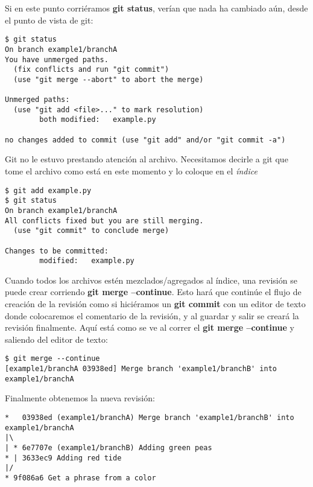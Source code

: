Si en este punto corriéramos {\bf git status}, verían que nada ha cambiado aún, desde el punto de vista de git:

\begin{lstlisting}[style=console_style, caption={\bf git status} luego de editar el archivo]
$ git status
On branch example1/branchA
You have unmerged paths.
  (fix conflicts and run "git commit")
  (use "git merge --abort" to abort the merge)

Unmerged paths:
  (use "git add <file>..." to mark resolution)
        both modified:   example.py

no changes added to commit (use "git add" and/or "git commit -a")
\end{lstlisting}

Git no le estuvo prestando atención al archivo. Necesitamos decirle a git que tome el archivo como está en este
momento y lo coloque en el {\it índice}

\begin{lstlisting}[style=console_style, caption={\bf git add; git status}]
$ git add example.py 
$ git status
On branch example1/branchA
All conflicts fixed but you are still merging.
  (use "git commit" to conclude merge)

Changes to be committed:
        modified:   example.py
\end{lstlisting}

Cuando todos los archivos estén mezclados/agregados al índice, una revisión se puede crear corriendo {\bf git merge --continue}.
Esto hará que continúe el flujo de creación de la revisión como si hiciéramos un {\bf git commit} con un editor de texto
donde colocaremos el comentario de la revisión, y al guardar y salir se creará la revisión finalmente. Aquí está como se
ve al correr el {\bf git merge --continue} y saliendo del editor de texto:
\begin{lstlisting}[style=console_style, caption={\bf git merge --continue}]
$ git merge --continue
[example1/branchA 03938ed] Merge branch 'example1/branchB' into example1/branchA
\end{lstlisting}

Finalmente obtenemos la nueva revisión:
\begin{lstlisting}[style=console_style, caption={\bf Ejemplo 1} - historia final de las ramas]
*   03938ed (example1/branchA) Merge branch 'example1/branchB' into example1/branchA
|\  
| * 6e7707e (example1/branchB) Adding green peas
* | 3633ec9 Adding red tide
|/  
* 9f086a6 Get a phrase from a color
\end{lstlisting}

